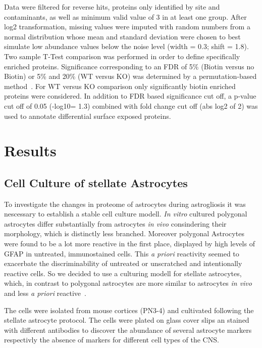 \documentclass[a4paper,11pt,bibtotocnumbered]{article}
\begin{document}
Data were filtered for reverse hits, proteins only identified by site and contaminants, as well as minimum valid value of 3 in at least one group. After log2 transformation, missing values were imputed with random numbers from a normal distribution whose mean and standard deviation were chosen to best simulate low abundance values below the noise level (width = 0.3; shift = 1.8). Two sample T-Test comparison was performed in order to define specifically enriched proteins. Significance corresponding to an FDR of 5\% (Biotin versus no Biotin) or 5\% and 20\% (WT versus KO) was determined by a permutation-based method~\cite{Tusher2001}. For WT versus KO comparison only significantly biotin enriched proteins were considered. In addition to FDR based significance cut off, a p-value cut off of 0.05 (-log10= 1.3) combined with fold change cut off (abs log2 of 2) was used to annotate differential surface exposed proteins.

\newpage
\section{Results}

\subsection{Cell Culture of stellate Astrocytes}

To investigate the changes in proteome of astrocytes during astrogliosis it was nescessary to establish a stable cell culture modell. \textit{In vitro} cultured polygonal astrocytes differ substantially from astrocytes \textit{in vivo} consindering their morphology, which is distinctly less branched. Moreover polygonal Astrocytes were found to be a lot more reactive in the first place, displayed by high levels of GFAP in untreated, immunostained cells. This \textit{a priori} reactivity seemed to exacerbate the discriminability of untreated or unscratched and intentionally reactive cells.
So we decided to use a culturing modell for stellate astrocytes, which, in contrast to polygonal astrocytes are more similar to astrocytes \textit{in vivo} and less \textit{a priori} reactive~\cite{Wolfes2017}. 

The cells were isolated from mouse cortices (PN3-4) and cultivated following the stellate astrocyte protocol. The cells were plated on glass cover slips an stained with different antibodies to discover the abundance of several astrocyte markers respectivly the absence of markers for different cell types of the CNS.
\end{document}
